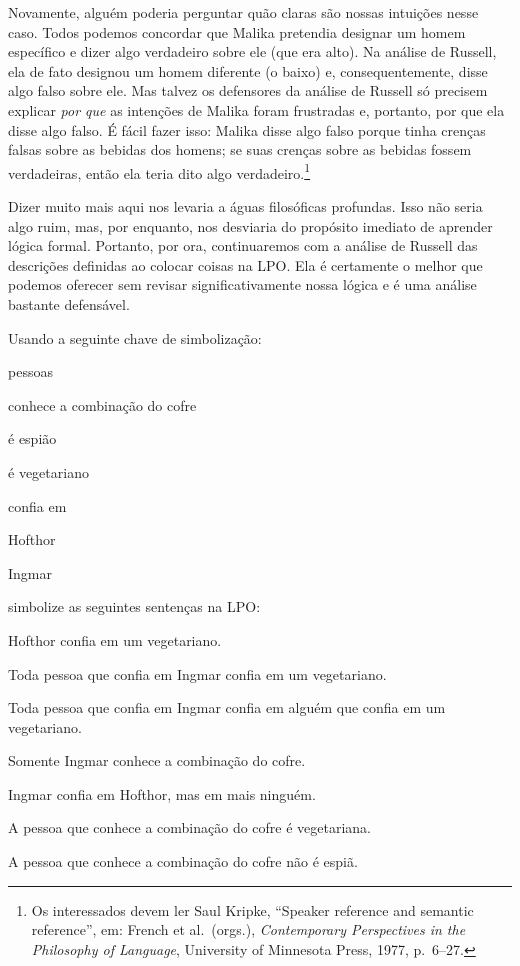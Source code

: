 Novamente, alguém poderia perguntar quão claras são nossas intuições nesse caso. Todos podemos concordar que Malika pretendia designar um homem específico e dizer algo verdadeiro sobre ele (que era alto). Na análise de Russell, ela de fato designou um homem diferente (o baixo) e, consequentemente, disse algo falso sobre ele. Mas talvez os defensores da análise de Russell só precisem explicar \emph{por que} as intenções de Malika foram frustradas e, portanto, por que ela disse algo falso. É fácil fazer isso: Malika disse algo falso porque tinha crenças falsas sobre as bebidas dos homens; se suas crenças sobre as bebidas fossem verdadeiras, então ela teria dito algo verdadeiro.\footnote{Os interessados devem ler Saul Kripke, \textquotedblleft Speaker reference and semantic reference\textquotedblright{}, em: French et al.~(orgs.), \textit{Contemporary Perspectives in the Philosophy of Language}, University of Minnesota Press, 1977, p.~6--27.}

Dizer muito mais aqui nos levaria a águas filosóficas profundas. Isso não seria algo ruim, mas, por enquanto, nos desviaria do propósito imediato de aprender lógica formal. Portanto, por ora, continuaremos com a análise de Russell das descrições definidas ao colocar coisas na LPO. Ela é certamente o melhor que podemos oferecer sem revisar significativamente nossa lógica e é uma análise bastante defensável.

\practiceproblems

\problempart
Usando a seguinte chave de simbolização:
\begin{ekey}
\item[\text{domínio}] pessoas
\item[\atom{K}{x}]  conhece a combinação do cofre
\item[\atom{S}{x}]  é espião
\item[\atom{V}{x}]  é vegetariano
\item[\atom{T}{x,y}]  confia em 
\item[h] Hofthor
\item[i] Ingmar
\end{ekey}
simbolize as seguintes sentenças na LPO:
\begin{compactlist}
\item Hofthor confia em um vegetariano.
\item Toda pessoa que confia em Ingmar confia em um vegetariano.
\item Toda pessoa que confia em Ingmar confia em alguém que confia em um vegetariano.
\item Somente Ingmar conhece a combinação do cofre.
\item Ingmar confia em Hofthor, mas em mais ninguém.
\item A pessoa que conhece a combinação do cofre é vegetariana.
\item A pessoa que conhece a combinação do cofre não é espiã.
\end{compactlist}


